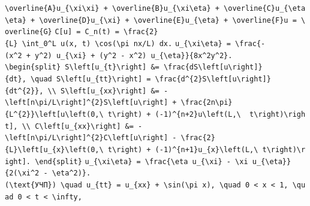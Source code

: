\documentclass[
  ukrainian,
]{article}
\begin{document}
\texttt{\textbackslash{}overline\{A\}u\_\{\textbackslash{}xi\textbackslash{}xi\}\ +\ \textbackslash{}overline\{B\}u\_\{\textbackslash{}xi\textbackslash{}eta\}\ +\ \textbackslash{}overline\{C\}u\_\{\textbackslash{}eta\textbackslash{}eta\}\ +\ \textbackslash{}overline\{D\}u\_\{\textbackslash{}xi\}\ +\ \textbackslash{}overline\{E\}u\_\{\textbackslash{}eta\}\ +\ \textbackslash{}overline\{F\}u\ =\ \textbackslash{}overline\{G\}}
\texttt{C{[}u{]}\ =\ C\_n(t)\ =\ \textbackslash{}frac\{2\}\{L\}\ \textbackslash{}int\_0\^{}L\ u(x,\ t)\ \textbackslash{}cos(\textbackslash{}pi\ nx/L)\ dx.}
\texttt{u\_\{\textbackslash{}xi\textbackslash{}eta\}\ =\ \textbackslash{}frac\{-(x\^{}2\ +\ y\^{}2)\ u\_\{\textbackslash{}xi\}\ +\ (y\^{}2\ -\ x\^{}2)\ u\_\{\textbackslash{}eta\}\}\{8x\^{}2y\^{}2\}.}
\texttt{\textbackslash{}begin\{split\}\ S\textbackslash{}left{[}u\_\{t\}\textbackslash{}right{]}\ \&=\ \textbackslash{}frac\{dS\textbackslash{}left{[}u\textbackslash{}right{]}\}\{dt\},\ \textbackslash{}quad\ S\textbackslash{}left{[}u\_\{tt\}\textbackslash{}right{]}\ =\ \textbackslash{}frac\{d\^{}\{2\}S\textbackslash{}left{[}u\textbackslash{}right{]}\}\{dt\^{}\{2\}\},\ \textbackslash{}\textbackslash{}\ S\textbackslash{}left{[}u\_\{xx\}\textbackslash{}right{]}\ \&=\ -\textbackslash{}left{[}n\textbackslash{}pi/L\textbackslash{}right{]}\^{}\{2\}S\textbackslash{}left{[}u\textbackslash{}right{]}\ +\ \textbackslash{}frac\{2n\textbackslash{}pi\}\{L\^{}\{2\}\}\textbackslash{}left{[}u\textbackslash{}left(0,\textbackslash{}\ t\textbackslash{}right)\ +\ (-1)\^{}\{n+2\}u\textbackslash{}left(L,\textbackslash{}\ \ t\textbackslash{}right)\textbackslash{}right{]},\ \textbackslash{}\textbackslash{}\ C\textbackslash{}left{[}u\_\{xx\}\textbackslash{}right{]}\ \&=\ -\textbackslash{}left{[}n\textbackslash{}pi/L\textbackslash{}right{]}\^{}\{2\}C\textbackslash{}left{[}u\textbackslash{}right{]}\ -\ \textbackslash{}frac\{2\}\{L\}\textbackslash{}left{[}u\_\{x\}\textbackslash{}left(0,\textbackslash{}\ t\textbackslash{}right)\ +\ (-1)\^{}\{n+1\}u\_\{x\}\textbackslash{}left(L,\textbackslash{}\ t\textbackslash{}right)\textbackslash{}right{]}.\ \textbackslash{}end\{split\}}
\texttt{u\_\{\textbackslash{}xi\textbackslash{}eta\}\ =\ \textbackslash{}frac\{\textbackslash{}eta\ u\_\{\textbackslash{}xi\}\ -\ \textbackslash{}xi\ u\_\{\textbackslash{}eta\}\}\{2(\textbackslash{}xi\^{}2\ -\ \textbackslash{}eta\^{}2)\}.}
\texttt{(\textbackslash{}text\{УЧП\})\ \textbackslash{}quad\ u\_\{tt\}\ =\ u\_\{xx\}\ +\ \textbackslash{}sin(\textbackslash{}pi\ x),\ \textbackslash{}quad\ 0\ \textless{}\ x\ \textless{}\ 1,\ \textbackslash{}quad\ 0\ \textless{}\ t\ \textless{}\ \textbackslash{}infty,}
\end{document}

